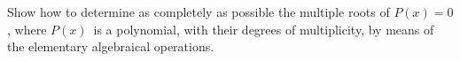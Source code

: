 Show how to determine as completely as possible the multiple roots
of $P(x) = 0$, where $P(x)$~is a polynomial, with their degrees of multiplicity,
by means of the elementary algebraical operations.

